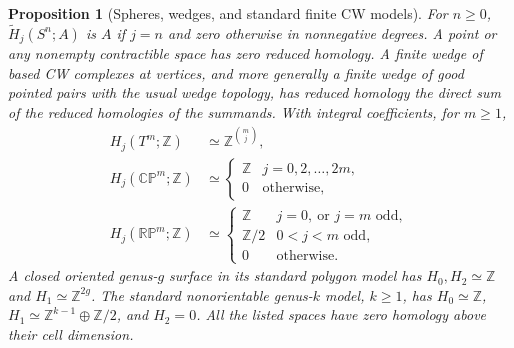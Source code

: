 \documentclass[11pt,oneside,openany]{book}
\theoremstyle{plain}
\newtheorem{proposition}[theorem]{Proposition}
\theoremstyle{definition}
\theoremstyle{remark}
\begin{document}
\begin{proposition}[Spheres, wedges, and standard finite CW models]\label{prop:p202-homology-computations}
For \(n\geq0\), \(\widetilde H_j(S^n;A)\) is \(A\) if \(j=n\)
and zero otherwise in nonnegative degrees. A point or any
nonempty contractible space has zero reduced homology. A finite
wedge of based CW complexes at vertices, and more generally a
finite wedge of good pointed pairs with the usual wedge topology,
has reduced homology the direct sum of the reduced homologies of
the summands. With integral coefficients, for \(m\geq1\),
\[
\begin{aligned}
 H_j(T^m;\mathbb Z)&\simeq \mathbb Z^{\binom m j},\\
 H_j(\mathbb{CP}^m;\mathbb Z)&\simeq
   \begin{cases}\mathbb Z & j=0,2,\ldots,2m,\\0&\text{otherwise},\end{cases}\\
 H_j(\mathbb{RP}^m;\mathbb Z)&\simeq
   \begin{cases}
      \mathbb Z & j=0,\ \text{or }j=m\text{ odd},\\
      \mathbb Z/2 & 0<j<m\text{ odd},\\
      0&\text{otherwise}.
   \end{cases}
\end{aligned}
\]
A closed oriented genus-\(g\) surface in its standard polygon
model has \(H_0,H_2\simeq\mathbb Z\) and
\(H_1\simeq\mathbb Z^{2g}\). The standard nonorientable genus-\(k\)
model, \(k\geq1\), has \(H_0\simeq\mathbb Z\),
\(H_1\simeq\mathbb Z^{k-1}\oplus\mathbb Z/2\), and \(H_2=0\).
All the listed spaces have zero homology above their cell dimension.
\end{proposition}
\end{document}
